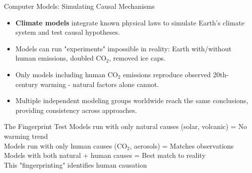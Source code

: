 \documentclass{beamer}
\begin{document}
	\begin{frame}{Computer Models: Simulating Causal Mechanisms}
		\begin{itemize}
			\item \textbf{Climate models} integrate known physical laws to simulate Earth's climate system and test causal hypotheses.
			\item Models can run "experiments" impossible in reality: Earth with/without human emissions, doubled CO$_{2}$, removed ice caps.
			\item Only models including human CO$_{2}$ emissions reproduce observed 20th-century warming - natural factors alone cannot.
			\item Multiple independent modeling groups worldwide reach the same conclusions, providing consistency across approaches.
		\end{itemize}
		
		\begin{alertblock}{The Fingerprint Test}
			Models run with only natural causes (solar, volcanic) = No warming trend\\
			Models run with only human causes (CO$_{2}$, aerosols) = Matches observations\\
			Models with both natural + human causes = Best match to reality\\
			\vspace{0.2cm}
			This "fingerprinting" identifies human causation
		\end{alertblock}
	\end{frame}
	
\end{document}
